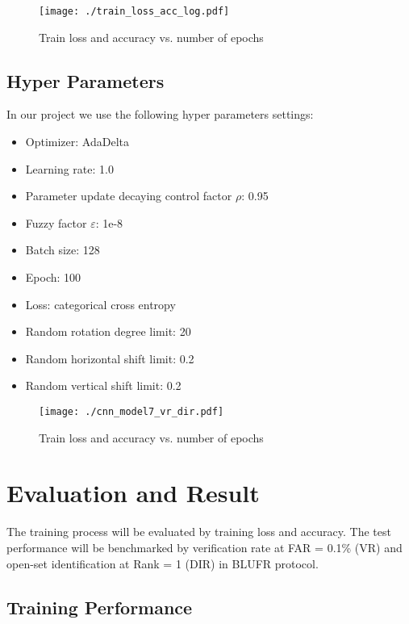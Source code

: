 \documentclass[conference]{IEEEtran}
\begin{document}
\begin{figure}
	\centering 
	\texttt{[image: ./train\_loss\_acc\_log.pdf]}
	\caption{Train loss and accuracy vs. number of epochs}
	\label{train_loss_acc} %
\end{figure}

\subsection{Hyper Parameters}

In our project we use the following hyper parameters settings:

\begin{itemize}
	\item Optimizer: AdaDelta \cite{zeiler2012adadelta}
	\item Learning rate: 1.0
	\item Parameter update decaying control factor $\rho$: 0.95
	\item Fuzzy factor $\varepsilon$: 1e-8
	\item Batch size: 128
	\item Epoch: 100
	\item Loss: categorical cross entropy
	\item Random rotation degree limit: 20
	\item Random horizontal shift limit: 0.2
	\item Random vertical shift limit: 0.2
\end{itemize}
\begin{figure}
	\centering 
	\texttt{[image: ./cnn\_model7\_vr\_dir.pdf]}
	\caption{Train loss and accuracy vs. number of epochs}
	\label{cnn_vr_dir} %
\end{figure}

\section{Evaluation and Result}

The training process will be evaluated by training loss and accuracy. The test performance will be benchmarked by verification rate at FAR = 0.1\% (VR) and open-set identification at Rank = 1 (DIR) in BLUFR protocol.

\subsection{Training Performance}
\end{document}

